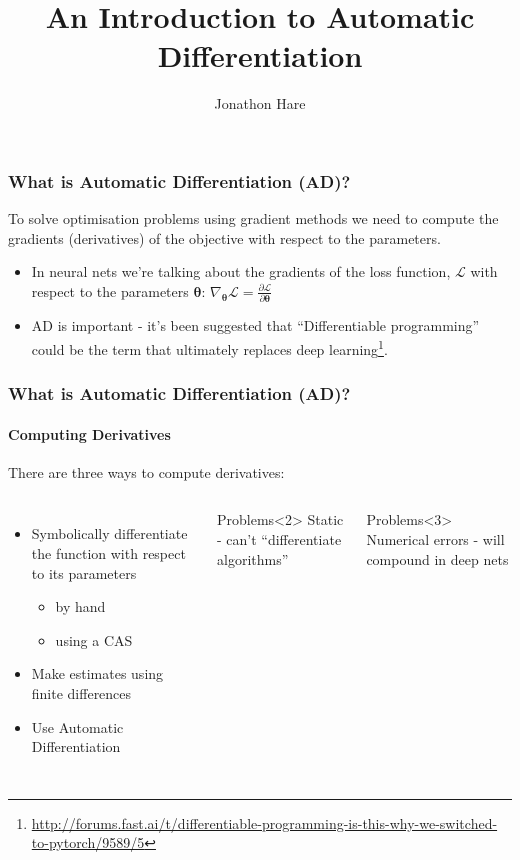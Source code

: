 \documentclass{beamer}
\title[Automatic Differentiation]{An Introduction to Automatic Differentiation}
\author{Jonathon Hare}
\institute[]
{
  Vision, Learning and Control\\
  University of Southampton 
}
\date{}
\begin{document}

\begin{frame}
\frametitle{What is Automatic Differentiation (AD)?}
To solve optimisation problems using gradient methods we need to compute the gradients (derivatives) of the objective with respect to the parameters.
\begin{itemize}
	\item In neural nets we're talking about the gradients of the loss function, $\mathcal{L}$ with respect to the parameters $\bm{\theta}$: 
	$\nabla_{\bm{\theta}} \mathcal{L} = \frac{\partial \mathcal{L}}{\partial \bm{\theta}}$
	\item AD is important - it's been suggested that ``Differentiable programming'' could be the term that ultimately replaces deep learning\footnote{\url{http://forums.fast.ai/t/differentiable-programming-is-this-why-we-switched-to-pytorch/9589/5}}.
\end{itemize}
\end{frame}

\begin{frame}
	\frametitle{What is Automatic Differentiation (AD)?}
	\framesubtitle{Computing Derivatives}
There are three ways to compute derivatives:

\begin{columns}
    \begin{itemize}
    	\item<1,2> Symbolically differentiate the function with respect to its parameters
    	\begin{itemize}
    		\item by hand
    		\item using a CAS
    	\end{itemize}
    	\item<1,3> Make estimates using finite differences
    	\item<1,4> Use Automatic Differentiation
    \end{itemize}

      \begin{block}{Problems}<2>
        Static - can't ``differentiate algorithms''
      \end{block}
      \begin{block}{Problems}<3>
        Numerical errors - will compound in deep nets
      \end{block}
  \end{columns}
\end{frame}
\end{document}
